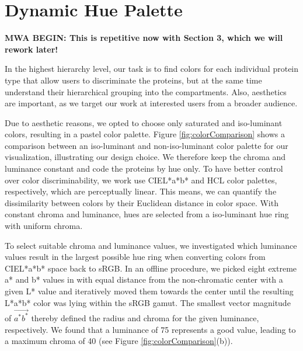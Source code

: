 \documentclass[review,journal]{vgtc}         %
\begin{document}
\section{Dynamic Hue Palette}
\label{sec:dynamic_color_palette}

\textbf{MWA BEGIN: This is repetitive now with Section 3, which we will rework later!}

In the highest hierarchy level, our task is to find colors for each individual protein type that allow users to discriminate the proteins, but at the same time understand their hierarchical grouping into the compartments. 
Also, aesthetics are important, as we target our work at interested users from a broader audience. 

Due to aesthetic reasons, we opted to choose only saturated and iso-luminant colors, resulting in a pastel color palette. 
Figure \ref{fig:colorComparison} shows a comparison between an iso-luminant and non-iso-luminant color palette for our visualization, illustrating our design choice. 
We therefore keep the chroma and luminance constant and code the proteins by hue only. 
To have better control over color discriminability, we work use CIEL*a*b* and HCL color palettes, respectively, which are perceptually linear. 
This means, we can quantify the dissimilarity between colors by their Euclidean distance in color space. 
With constant chroma and luminance, hues are selected from a iso-luminant hue ring with uniform chroma. 

To select suitable chroma and luminance values, we investigated which luminance values result in the largest possible hue ring when converting colors from CIEL*a*b* space back to sRGB. 
In an offline procedure, we picked eight extreme a* and b* values in with equal distance from the non-chromatic center with a given L* value and iteratively moved them towards the center until the resulting L*a*b* color was lying within the sRGB gamut. 
The smallest vector magnitude of $\vec{a^*b^*}$ thereby defined the radius and chroma for the given luminance, respectively. 
We found that a luminance of 75 represents a good value, leading to a maximum chroma of 40 (see Figure \ref{fig:colorComparison}(b)). 
\end{document}
